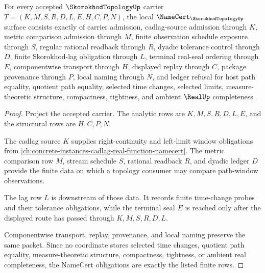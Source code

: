 \begin{theorem}
\label{thm:skorokhod-topology-namecert-obligations}
For every accepted $\SkorokhodTopologyUp$ carrier $T=(K,M,S,R,D,L,E,H,C,P,N)$, the local $\NameCert_{\SkorokhodTopologyUp}$ surface consists exactly of carrier admission, cadlag-source admission through $K$, metric comparison admission through $M$, finite observation schedule exposure through $S$, regular rational readback through $R$, dyadic tolerance control through $D$, finite Skorokhod-lag obligation through $L$, terminal real-seal ordering through $E$, componentwise transport through $H$, displayed replay through $C$, package provenance through $P$, local naming through $N$, and ledger refusal for host path equality, quotient path equality, selected time changes, selected limits, measure-theoretic structure, compactness, tightness, and ambient $\RealUp$ completeness.
\end{theorem}
\begin{proof}
Project the accepted carrier. The analytic rows are $K,M,S,R,D,L,E$, and the structural rows are $H,C,P,N$.

The cadlag source $K$ supplies right-continuity and left-limit window obligations from \autoref{ch:concrete-instances-cadlag-real-function-namecert}. The metric comparison row $M$, stream schedule $S$, rational readback $R$, and dyadic ledger $D$ provide the finite data on which a topology consumer may compare path-window observations.

The lag row $L$ is downstream of those data. It records finite time-change probes and their tolerance obligations, while the terminal seal $E$ is reached only after the displayed route has passed through $K,M,S,R,D,L$.

Componentwise transport, replay, provenance, and local naming preserve the same packet. Since no coordinate stores selected time changes, quotient path equality, measure-theoretic structure, compactness, tightness, or ambient real completeness, the NameCert obligations are exactly the listed finite rows.
\end{proof}

